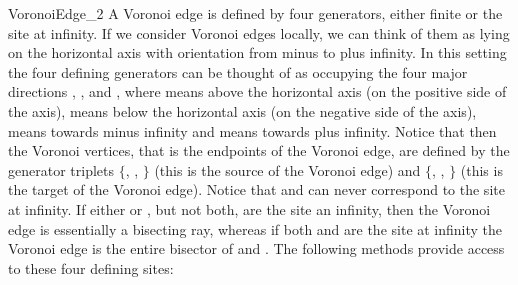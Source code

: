 \begin{ccRefConcept}{VoronoiEdge_2}
A Voronoi edge is defined by four generators, either finite or the
site at infinity. If we consider Voronoi edges locally, we can think
of them as lying on the horizontal axis with orientation from minus to
plus infinity. In this setting the four defining generators can be
thought of as occupying the four major directions ,
,  and , where
 means above the horizontal axis (on the positive
side of the axis),  means below the horizontal axis (on the
negative side of the axis),  means towards minus
infinity and  means towards plus infinity. Notice that
then the Voronoi vertices, that is the endpoints of the Voronoi edge,
are defined by the generator triplets $\{$,
, $\}$ (this is the source of the Voronoi
edge) and $\{$, , $\}$
(this is the target  of the Voronoi edge). Notice that 
and  can never correspond to the site at infinity. If
either  or , but not both, are the
site an infinity, then the Voronoi edge is essentially a bisecting
ray, whereas if both  and  are the site at
infinity the Voronoi edge is the entire bisector of 
and . The following methods provide access to these
four defining sites:

\ccThreeToTwo
%
\ccGlue
{}
\ccGlue
{}
\ccGlue
{}



\ccThreeToTwo
%
\ccGlue
{}
\ccGlue
{}
\ccGlue
{}
\ccGlue
{}



\end{ccRefConcept}
